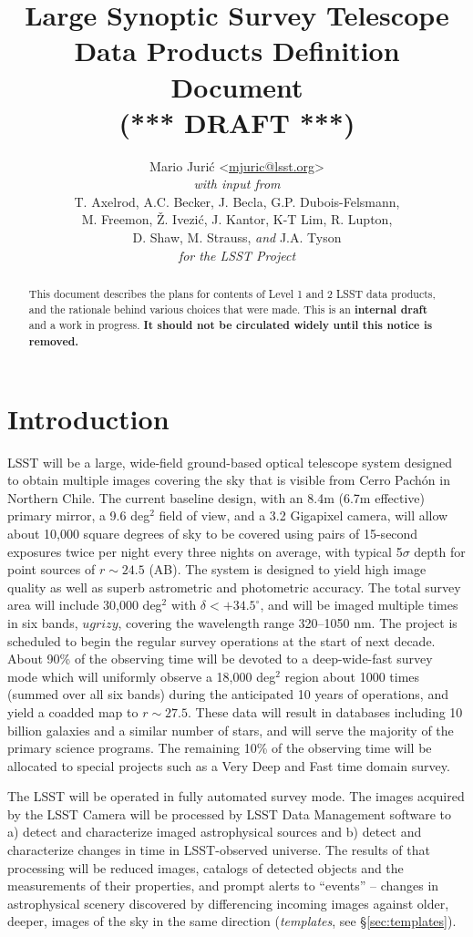 \documentclass[12pt]{article}
\title{Large Synoptic Survey Telescope \\
Data Products Definition Document \\
(*** DRAFT ***)}
\author{
    Mario Juri\'c \textless\href{mailto:mjuric@lsst.org}{mjuric@lsst.org}\textgreater \vspace{1ex} \\
    {\em with input from} \vspace{1ex} \\
    T. Axelrod, A.C. Becker, J. Becla,  G.P. Dubois-Felsmann, \\
    M. Freemon, \v{Z}. Ivezi\'c, J. Kantor, K-T Lim, R. Lupton, \\
    D. Shaw, M. Strauss, {\em and} J.A. Tyson \vspace{1.2ex} \\
    {\em for the LSST Project}
}
\newcommand{\B}[1]{{#1}}
\newcommand{\R}[1]{{\color{red}}}
\begin{document}
\maketitle

\begin{abstract}
This document describes the plans for contents of Level 1 and 2 LSST data
products, and the rationale behind various choices that were made. This is an
{\bf internal draft} and a work in progress. {\bf It should not be circulated
widely until this notice is removed.}
\end{abstract}

\tableofcontents

\section{Introduction}

LSST will be a large, wide-field ground-based optical telescope system
designed to obtain multiple images covering the sky that is visible from Cerro
Pach\'{o}n in Northern Chile. The current baseline design, with an 8.4m (6.7m
effective) primary mirror, a 9.6 deg$^2$ field of view, and a 3.2 Gigapixel
camera, will allow about 10,000 square degrees of sky to be covered using
pairs of 15-second exposures \R{in two photometric bands} \B{twice per night}
every three nights on average, with typical 5$\sigma$ depth for point sources
of $r\sim24.5$ (AB). The system is designed to yield high image quality as
well as superb astrometric and photometric accuracy. The \B{total} survey area
will include 30,000 deg$^2$ with $\delta<+34.5^\circ$, and will be imaged
multiple times in six bands, $ugrizy$, covering the wavelength range 320--1050
nm. The project is scheduled to begin the regular survey operations at the
start of next decade. About 90\% of the observing time will be devoted to a
deep-wide-fast survey mode which will \B{uniformly} observe a 18,000 deg$^2$
region about 1000 times (summed over all six bands) during the anticipated 10
years of operations, and yield a coadded map to $r\sim27.5$. These data will
result in databases including 10 billion galaxies and a similar number of
stars, and will serve the majority of the primary science programs. The
remaining 10\% of the observing time will be allocated to special projects
such as a Very Deep and Fast time domain survey.

The LSST will be operated in fully automated survey mode. The images acquired
by the LSST Camera will be processed by LSST Data Management software to a)
detect and characterize imaged astrophysical sources and b) detect and
characterize changes in time in LSST-observed universe. The results of that
processing will be reduced images, catalogs of detected objects and the
measurements of their properties, and prompt alerts to ``events'' -- changes
in astrophysical scenery discovered by differencing incoming images against
older, deeper, images of the sky in the same direction ({\em templates}, see
\S \ref{sec:templates}).
\end{document}
